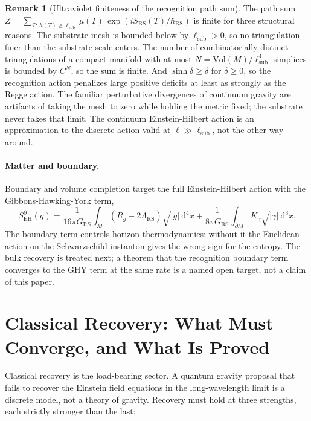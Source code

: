 \documentclass[11pt,letterpaper]{article}
\theoremstyle{definition}
\newtheorem{remark}[theorem]{Remark}
\newcommand{\RS}{\mathrm{RS}}
\newcommand{\EH}{\mathrm{EH}}
\newcommand{\bsub}{\mathrm{sub}}
\newcommand{\dd}{\mathrm{d}}
\newcommand{\Vol}{\mathrm{Vol}}
\begin{document}
\begin{remark}[Ultraviolet finiteness of the recognition path sum]
\label{rem:uv}
The path sum
$Z=\sum_{T:\,h(T)\ge\ell_\bsub}\mu(T)\,
\exp(iS_\RS(T)/\hbar_\RS)$
is finite for three structural reasons.  The substrate mesh is bounded
below by $\ell_\bsub>0$, so no triangulation finer than the substrate
scale enters.  The number of combinatorially distinct triangulations
of a compact manifold with at most $N=\Vol(M)/\ell_\bsub^4$ simplices
is bounded by $C^N$, so the sum is finite.  And
$\sinh\delta\ge\delta$ for $\delta\ge 0$, so the recognition action
penalizes large positive deficits at least as strongly as the Regge
action.  The familiar perturbative divergences of continuum gravity
are artifacts of taking the mesh to zero while holding the metric
fixed; the substrate never takes that limit.  The continuum
Einstein-Hilbert action is an approximation to the discrete action
valid at $\ell\gg\ell_\bsub$, not the other way around.
\end{remark}

\paragraph{Matter and boundary.}
Boundary and volume completion target the full Einstein-Hilbert action
with the Gibbons-Hawking-York term,
\begin{equation}\label{eq:SEH}
S_\EH^{\partial}(g)=\frac{1}{16\pi G_\RS}\int_M(R_g-2\Lambda_\RS)
\sqrt{|g|}\,\dd^4x
+\frac{1}{8\pi G_\RS}\int_{\partial M}K_\gamma\sqrt{|\gamma|}\,\dd^3x .
\end{equation}
The boundary term controls horizon thermodynamics: without it the
Euclidean action on the Schwarzschild instanton gives the wrong sign
for the entropy.  The bulk recovery is treated next; a theorem that the
recognition boundary term converges to the GHY term at the same rate
is a named open target, not a claim of this paper.

\section{Classical Recovery: What Must Converge, and What Is Proved}
\label{sec:recovery}

Classical recovery is the load-bearing sector.  A quantum gravity
proposal that fails to recover the Einstein field equations in the
long-wavelength limit is a discrete model, not a theory of gravity.
Recovery must hold at three strengths, each strictly stronger than the
last:
\end{document}
